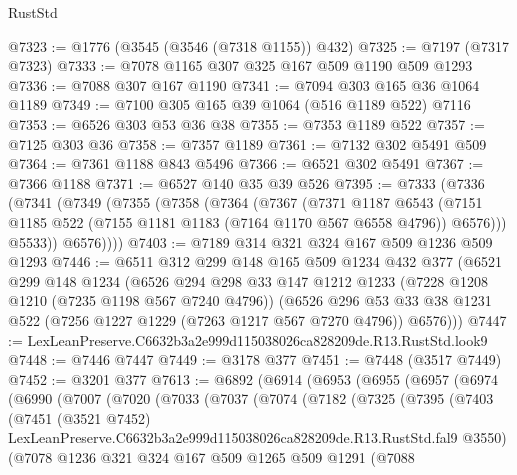 \begin{lexlean}{RustStd}
\begin{coremodule}
@7323 := @1776 (@3545 (@3546 (@7318 @1155)) @432)
@7325 := @7197 (@7317 @7323)
@7333 := @7078 @1165 @307 @325 @167 @509 @1190 @509 @1293
@7336 := @7088 @307 @167 @1190
@7341 := @7094 @303 @165 @36 @1064 @1189
@7349 := @7100 @305 @165 @39 @1064 (@516 @1189 @522) @7116
@7353 := @6526 @303 @53 @36 @38
@7355 := @7353 @1189 @522
@7357 := @7125 @303 @36
@7358 := @7357 @1189
@7361 := @7132 @302 @5491 @509
@7364 := @7361 @1188 @843 @5496
@7366 := @6521 @302 @5491
@7367 := @7366 @1188
@7371 := @6527 @140 @35 @39 @526
@7395 := @7333
    (@7336
      (@7341
        (@7349
          (@7355
            (@7358
              (@7364
                (@7367
                  (@7371
                    @1187
                    @6543
                    (@7151 @1185 @522 (@7155 @1181 @1183 (@7164 @1170 @567 @6558 @4796)) @6576)))
                @5533))
            @6576))))
@7403 := @7189 @314 @321 @324 @167 @509 @1236 @509 @1293
@7446 := @6511
    @312
    @299
    @148
    @165
    @509
    @1234
    @432
    @377
    (@6521
      @299
      @148
      @1234
      (@6526
        @294
        @298
        @33
        @147
        @1212
        @1233
        (@7228 @1208 @1210 (@7235 @1198 @567 @7240 @4796))
        (@6526
          @296
          @53
          @33
          @38
          @1231
          @522
          (@7256 @1227 @1229 (@7263 @1217 @567 @7270 @4796))
          @6576)))
@7447 := LexLeanPreserve.C6632b3a2e999d115038026ca828209de.R13.RustStd.look9
@7448 := @7446 @7447
@7449 := @3178 @377
@7451 := @7448 (@3517 @7449)
@7452 := @3201 @377
@7613 := @6892
    (@6914
      (@6953
        (@6955
          (@6957
            (@6974
              (@6990
                (@7007
                  (@7020
                    (@7033
                      (@7037
                        (@7074
                          (@7182
                            (@7325
                              (@7395
                                (@7403
                                  (@7451
                                    (@3521 @7452)
                                    LexLeanPreserve.C6632b3a2e999d115038026ca828209de.R13.RustStd.fal9
                                    @3550)
                                  (@7078
                                    @1236
                                    @321
                                    @324
                                    @167
                                    @509
                                    @1265
                                    @509
                                    @1291
                                    (@7088

\end{coremodule}
\end{lexlean}
